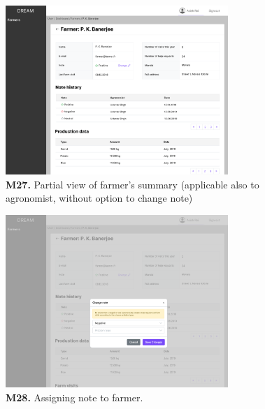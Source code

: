 \begin{figure}[H]
    \centering
    \includegraphics[width=0.75\textwidth]{mockups/Policy maker_Dashboard_Farmers_Farmer_part1.png}
    \caption{\textbf{M27.} Partial view of farmer's summary (applicable also to agronomist, without option to change note)}
\end{figure}

\begin{figure}[H]
    \centering
    \includegraphics[width=0.75\textwidth]{mockups/Policy maker_Dashboard_Farmers_Farmer_Note_1.png}
    \caption{\textbf{M28.} Assigning note to farmer.}
\end{figure}
